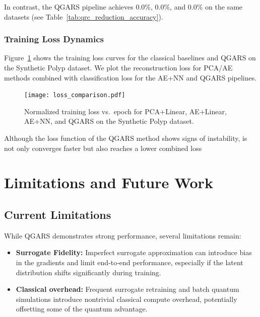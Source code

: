 \documentclass[conference]{IEEEtran}
\begin{document}
\noindent
In contrast, the QGARS pipeline achieves 0.0\%, 0.0\%, and 0.0\% on the same datasets (see Table~\ref{tab:qrc_reduction_accuracy}).

\subsubsection{Training Loss Dynamics}

Figure~\ref{fig:loss_curves} shows the training loss curves for the classical baselines and QGARS on the Synthetic Polyp dataset. We plot the reconstruction loss for PCA/AE methods combined with classification loss for the AE+NN and QGARS pipelines.

\begin{figure}[ht]
  \centering
  \texttt{[image: loss\_comparison.pdf]}
  \caption{Normalized training loss vs.\ epoch for PCA+Linear, AE+Linear, AE+NN, and QGARS on the Synthetic Polyp dataset.}
  \label{fig:loss_curves}
\end{figure}

\noindent
Although the loss function of the QGARS method shows
signs of instability, is not only converges faster but also reaches a 
lower combined loss

\section{Limitations and Future Work}
\subsection{Current Limitations}
While QGARS demonstrates strong performance, several limitations remain:
\begin{itemize}
    \item \textbf{Surrogate Fidelity:}
    Imperfect surrogate approximation can introduce bias in the gradients and limit end‐to‐end 
    performance, especially if the latent distribution shifts significantly during training.
    \item \textbf{Classical overhead:}  
    Frequent surrogate retraining and batch quantum simulations introduce 
    nontrivial classical compute overhead, potentially offsetting some of the 
    quantum advantage.
\end{itemize}
\end{document}
